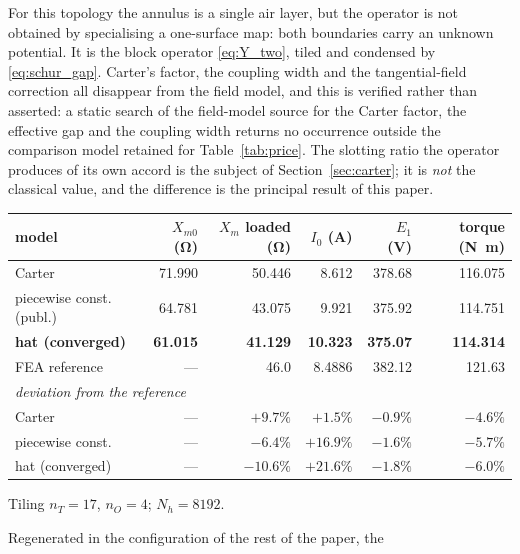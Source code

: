 \documentclass[10pt,a4paper,twocolumn]{article}
\theoremstyle{plain}
\theoremstyle{remark}
\begin{document}
For this topology the annulus is a single air layer, but the operator is
not obtained by specialising a one-surface map: both boundaries carry an
unknown potential. It is the block operator \eqref{eq:Y_two}, tiled and
condensed by \eqref{eq:schur_gap}. Carter's factor, the coupling width
and the tangential-field correction all disappear from the field model,
and this is verified rather than asserted: a static search of the
field-model source for the Carter factor, the effective gap and the
coupling width returns no occurrence outside the comparison model
retained for Table~\ref{tab:price}. The slotting ratio the operator
produces of its own accord is the subject of Section~\ref{sec:carter};
it is \emph{not} the classical value, and the difference is the
principal result of this paper.

\begin{table}[!t]
\centering
\begin{threeparttable}
\footnotesize
\begin{tabular}{lrrrrr}
\toprule
model & $X_{m0}$ (\si{\ohm}) & $X_m$ loaded (\si{\ohm})
      & $I_0$ (\si{\ampere}) & $E_1$ (\si{\volt})
      & torque (\si{\newton\metre})\\
\midrule
Carter                 & \num{71.990} & \num{50.446} & \num{8.612}  & \num{378.68} & \num{116.075}\\
piecewise const. (publ.)& \num{64.781} & \num{43.075} & \num{9.921}  & \num{375.92} & \num{114.751}\\
\textbf{hat (converged)}& \textbf{\num{61.015}} & \textbf{\num{41.129}} & \textbf{\num{10.323}} & \textbf{\num{375.07}} & \textbf{\num{114.314}}\\
\midrule
FEA reference          & ---          & \num{46.0}\tnote{a}   & \num{8.4886}   & \num{382.12}  & \num{121.63}\\
\midrule
\multicolumn{6}{l}{\emph{deviation from the reference}}\\
Carter                 & --- & $+9.7\%$  & $+1.5\%$  & $-0.9\%$ & $-4.6\%$\\
piecewise const.       & --- & $-6.4\%$  & $+16.9\%$ & $-1.6\%$ & $-5.7\%$\\
hat (converged)        & --- & $-10.6\%$ & $+21.6\%$ & $-1.8\%$ & $-6.0\%$\\
\bottomrule
\end{tabular}
\begin{tablenotes}[flushleft]\footnotesize
\item Tiling
$n_T=17$, $n_O=4$; $N_h=\num{8192}$.
\item Regenerated in the configuration of the rest of the paper, the

\end{tablenotes}
\end{threeparttable}
\end{table}
\end{document}
